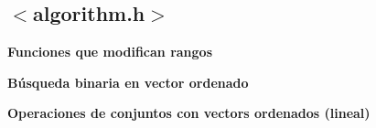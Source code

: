 \subsection{$<$algorithm.h$>$}
    \textbf{Funciones que modifican rangos}
    

    \textbf{Búsqueda binaria en vector ordenado}
    

    \textbf{Operaciones de conjuntos con vectors ordenados (lineal)}
    
    